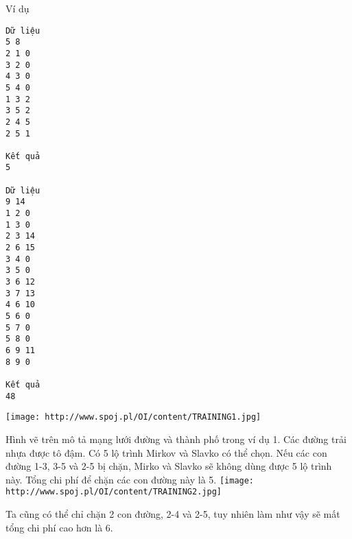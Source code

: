 Ví dụ  
\begin{verbatim}
Dữ liệu
5 8
2 1 0
3 2 0
4 3 0
5 4 0
1 3 2
3 5 2
2 4 5
2 5 1

Kết quả
5

Dữ liệu
9 14
1 2 0
1 3 0
2 3 14
2 6 15
3 4 0
3 5 0
3 6 12
3 7 13
4 6 10
5 6 0
5 7 0
5 8 0
6 9 11
8 9 0

Kết quả
48
\end{verbatim}
\texttt{[image: http://www.spoj.pl/OI/content/TRAINING1.jpg]}

   Hình vẽ trên mô tả mạng lưới đường và thành phố trong ví dụ 1. Các đường trải nhựa được tô đậm. Có 5 lộ trình Mirkov và Slavko có thể chọn. Nếu các con đường 1-3, 3-5 và 2-5 bị chặn, Mirko và Slavko sẽ không dùng được 5 lộ trình này. Tổng chi phí để chặn các con đường này là 5.  
\texttt{[image: http://www.spoj.pl/OI/content/TRAINING2.jpg]}

   Ta cũng có thể chỉ chặn 2 con đường, 2-4 và 2-5, tuy nhiên làm như vậy sẽ mất tổng chi phí cao hơn là 6.